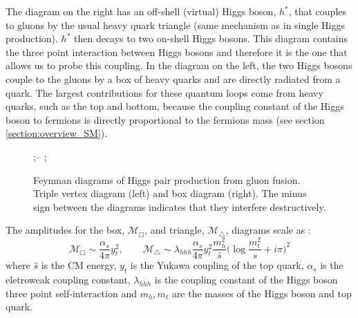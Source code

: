 
The diagram on the right has an off-shell (virtual) Higgs boson, $h^*$, that couples to gluons by the usual heavy quark triangle (same mechanism as in single Higgs production). $h^*$  then decays to two on-shell Higgs bosons. This diagram contains the three point interaction between Higgs bosons and therefore it is the one that allows us to probe this coupling. In the diagram on the left, the two Higgs bosons couple to the gluons by a box of heavy quarks and are directly radiated from a quark. The largest contributions for these quantum loops come from heavy quarks, such as the top and bottom, because the coupling constant of the Higgs boson to fermions is directly proportional to the fermions mass (see section \ref{section:overview_SM}).

\begin{figure}[h]
	\centering
	;\qquad \--- \qquad
	; 
	\caption{Feynman diagrams of Higgs pair production from gluon fusion. Triple vertex diagram (left) and box diagram (right). The minus sign between the diagrams indicates that they interfere destructively.}
	\label{fig:higgs_pair}
\end{figure}


The amplitudes for the box, $\mathcal{M}_{\Box}$, and triangle, $\mathcal{M}_{\triangle}$, diagrams scale as \cite{FCCyellow}:
\begin{equation}
\mathcal{M}_{\Box} \sim \frac{\alpha_s}{4\pi} y_t^2, \qquad \mathcal{M}_{\triangle} \sim \lambda_{hhh} \frac{\alpha_s}{4\pi} y_t^2 \frac{m_h^2}{\hat{s}}\Big(\log \frac{m_t^2}{\hat{s}} + i\pi\Big)^2
\label{eq:hh_M}
\end{equation}
where $\hat{s}$ is the CM energy, $y_t$ is the Yukawa coupling of the top quark, $\alpha_s$ is the eletroweak coupling constant, $\lambda_{hhh}$ is the coupling constant of the Higgs boson three point self-interaction and $m_h, m_t$ are the masses of the Higgs boson and top quark.

